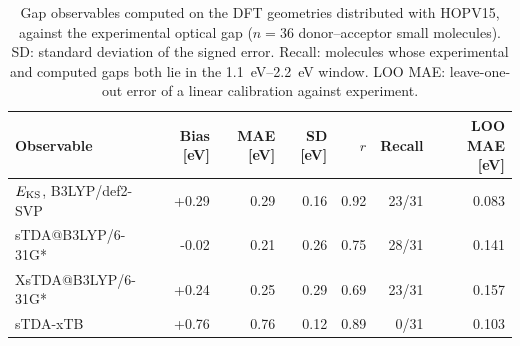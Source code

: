 \begin{table}[h]
\centering
\caption{Gap observables computed on the DFT geometries distributed with HOPV15, against the experimental optical gap
($n = 36$ donor--acceptor small molecules). SD: standard deviation of the signed error. Recall: molecules whose
experimental and computed gaps both lie in the \qtyrange{1.1}{2.2}{eV} window. LOO MAE: leave-one-out error of a linear
calibration against experiment.}
\label{tab:si-std2}
\begin{tabular}{lrrrrrr}
\toprule
Observable & Bias [eV] & MAE [eV] & SD [eV] & $r$ & Recall & LOO MAE [eV]\\
\midrule
$E_{\mathrm{KS}}$, B3LYP/def2-SVP & +0.29 & 0.29 & 0.16 & 0.92 & 23/31 & 0.083 \\
sTDA@B3LYP/6-31G* & -0.02 & 0.21 & 0.26 & 0.75 & 28/31 & 0.141 \\
XsTDA@B3LYP/6-31G* & +0.24 & 0.25 & 0.29 & 0.69 & 23/31 & 0.157 \\
sTDA-xTB & +0.76 & 0.76 & 0.12 & 0.89 & 0/31 & 0.103 \\
\bottomrule
\end{tabular}
\end{table}
